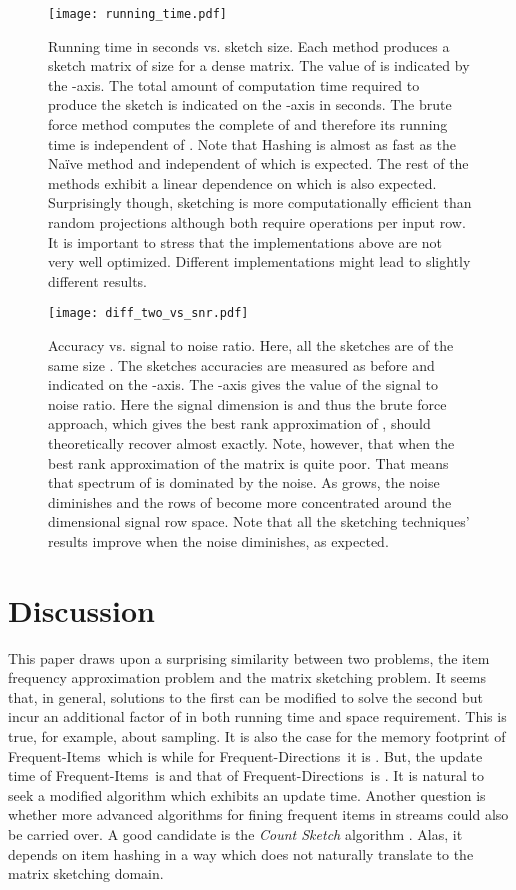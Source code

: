 \documentclass[]{article}
\newcommand{\FI}{Frequent-Items}
\newcommand{\FD}{Frequent-Directions}
\newcommand{\myfigurewidth}{0.7}
\begin{document}
\begin{figure}[htbp]
\begin{center}
\texttt{[image: running\_time.pdf]}
\caption{Running time in seconds vs. sketch size. 
Each method produces a sketch matrix  of size  for a dense  matrix. 
The value of  is indicated by the -axis. 
The total amount of computation time required to produce the sketch is indicated on the -axis in seconds.
The brute force method computes the complete  of  and therefore its running time is independent of .
Note that Hashing is almost as fast as the Na\"ive method and independent of  which is expected.
The rest of the methods exhibit a linear dependence on  which is also expected.
Surprisingly though, sketching is more computationally efficient than random projections although both require  operations per input row.
It is important to stress that the implementations above are not very well optimized. 
Different implementations might lead to slightly different results.
}
\label{running_time}
\end{center}
\end{figure}


\begin{figure}[htbp]
\begin{center}
\texttt{[image: diff\_two\_vs\_snr.pdf]}
\caption{Accuracy vs. signal to noise ratio. Here, all the sketches are of the same size .
The sketches accuracies are measured as before and indicated on the -axis. 
The -axis gives the value of  the signal to noise ratio.
Here the signal dimension is  and thus the brute force approach, 
which gives the best rank  approximation of , should theoretically recover  almost exactly.
Note, however, that when  the best rank  approximation of the matrix is quite poor.
That means that spectrum of  is dominated by the noise. 
As  grows, the noise diminishes and the rows of  become more concentrated around the  dimensional signal row space.
Note that all the sketching techniques' results improve when the noise diminishes, as expected.  
}
\label{diff_two_vs_snr}
\end{center}
\end{figure}


\section{Discussion}
This paper draws upon a surprising similarity between two problems, the item frequency approximation problem and the matrix sketching problem.
It seems that, in general, solutions to the first can be modified to solve the second but incur 
an additional factor of  in both running time and space requirement. 
This is true, for example, about sampling.
It is also the case for the memory footprint of \FI~which is  while for \FD~it is . 
But, the update time of \FI~is  and that of \FD~is . 
It is natural to seek a modified algorithm which exhibits an  update time.
Another question is whether more advanced algorithms for fining frequent items in streams could also be carried over.
A good candidate is the {\it Count Sketch} algorithm \cite{Charikar2002}. 
Alas, it depends on item hashing in a way which does not naturally translate to the matrix sketching domain.
\end{document}
